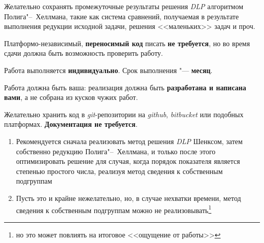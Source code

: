 \documentclass{ca-capstone}
\begin{document}
Желательно сохранять промежуточные результаты решения \emph{DLP} алгоритмом Полига"--~Хеллмана,
такие как система сравнений, получаемая в результате выполнения редукции исходной задачи,
решения <<маленьких>> задач и проч.

Платформо-независимый, \textbf{переносимый код} писать \textbf{не требуется}, но во время сдачи
должна быть возможность проверить работу.

\schedule
Работа выполняется \textbf{индивидуально}. Срок выполнения "--- \textbf{месяц}.

Работа должна быть ваша: реализация должна быть \textbf{разработана и написана вами}, а не
собрана из кусков чужих работ.

Желательно хранить код в \emph{git}-репозитории на \emph{github}, \emph{bitbucket} или подобных
платформах. \textbf{Документация не требуется}.

\remarks
\begin{enumerate}
  \item Рекомендуется сначала реализовать метод решения \emph{DLP} Шенксом, затем собственно
    редукцию Полига"--~Хеллмана, и только после этого оптимизировать решение для случая, когда
    порядок показателя является степенью простого числа, реализуя метод сведения к
    собственным подгруппам
  \item Пусть это и крайне нежелательно, но, в случае нехватки времени, метод сведения к
    собственным подгруппам можно не реализовывать\footnote{но это может повлиять на итоговое
    <<ощущение от работы>>}
\end{enumerate}

\end{document}
